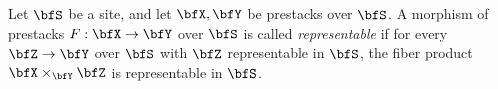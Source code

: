    \begin{definition}%
        Let \(\bfS\) be a site, and let \(\bfX, \bfY\) be prestacks over \(\bfS\).
        A morphism of prestacks \(F: \bfX \to \bfY\) over \(\bfS\) is called \emph{representable} if for every \(\bfZ \to \bfY\) over \(\bfS\) with \(\bfZ\) representable in \(\bfS\),
        the fiber product \(\bfX \times_{\bfY} \bfZ\) is representable in \(\bfS\).
    \end{definition}


